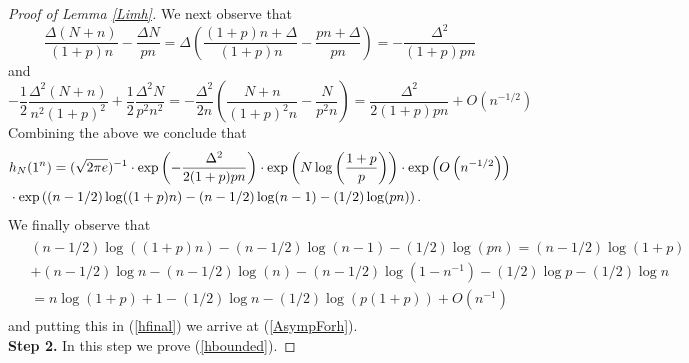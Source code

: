 \begin{proof}[Proof of Lemma \ref{Limh}]
We next observe that 
$$\frac{\Delta(N+n)}{(1+p)n}-\frac{\Delta N}{pn}=\Delta\left(\frac{(1+p)n+\Delta}{(1+p)n}-\frac{pn+\Delta}{pn}\right)=-\frac{\Delta^2}{(1+p)pn}$$
 and $$-\frac{1}{2}\frac{\Delta^2(N+n)}{n^2(1+p)^2}+\frac{1}{2}\frac{\Delta^2N}{p^2 n^2}=-\frac{\Delta^2}{2n}\left(\frac{N+n}{(1+p)^2n}-\frac{N}{p^2n}\right)=\frac{\Delta^2}{2(1+p)pn}+O\left(n^{-1/2}\right)$$
Combining the above we conclude that 
\begin{align}{\label{hfinal}}
\begin{split}
	& h_{N}(1^n)=(\sqrt{2\pi e})^{-1}\cdot \exp\left(-\frac{\Delta^2}{2(1+p)pn}\right)\cdot\exp\left(N\log\left(\frac{1+p}{p}\right)\right)\cdot\exp\left(O\left(n^{-1/2}\right)\right)\\
	&\cdot \exp\left((n-1/2)\log((1+p)n)-(n-1/2)\log(n-1)-(1/2)\log(pn)\right).
\end{split}
\end{align}
We finally observe that 
\begin{align*}
\begin{split}
	& (n-1/2)\log((1+p)n)-(n-1/2)\log(n-1)-(1/2)\log(pn)=(n-1/2)\log(1+p)\\
	& +(n-1/2)\log n-(n-1/2)\log(n)-(n-1/2)\log(1-n^{-1})-(1/2)\log p-(1/2)\log n\\
	& = n\log(1+p)+1-(1/2)\log n -(1/2)\log(p(1+p))+O\left(n^{-1}\right)
\end{split}
\end{align*}
and putting this in (\ref{hfinal}) we arrive at (\ref{AsympForh}).\\
\textbf{Step 2.} In this step we prove (\ref{hbounded}).
\end{proof}

